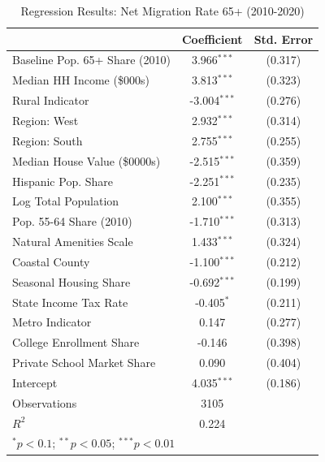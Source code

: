\begin{table}[htbp]
\centering
\caption{Regression Results: Net Migration Rate 65+ (2010-2020)}
\label{tab:netmig_regression}
\begin{tabular}{lcc}
\hline\hline
 & Coefficient & Std. Error \\
\hline
Baseline Pop. 65+ Share (2010) & 3.966$^{***}$ & (0.317) \\
Median HH Income (\$000s) & 3.813$^{***}$ & (0.323) \\
Rural Indicator & -3.004$^{***}$ & (0.276) \\
Region: West & 2.932$^{***}$ & (0.314) \\
Region: South & 2.755$^{***}$ & (0.255) \\
Median House Value (\$0000s) & -2.515$^{***}$ & (0.359) \\
Hispanic Pop. Share & -2.251$^{***}$ & (0.235) \\
Log Total Population & 2.100$^{***}$ & (0.355) \\
Pop. 55-64 Share (2010) & -1.710$^{***}$ & (0.313) \\
Natural Amenities Scale & 1.433$^{***}$ & (0.324) \\
Coastal County & -1.100$^{***}$ & (0.212) \\
Seasonal Housing Share & -0.692$^{***}$ & (0.199) \\
State Income Tax Rate & -0.405$^{*}$ & (0.211) \\
Metro Indicator & 0.147 & (0.277) \\
College Enrollment Share & -0.146 & (0.398) \\
Private School Market Share & 0.090 & (0.404) \\
Intercept & 4.035$^{***}$ & (0.186) \\
\hline
Observations & 3105 & \\
$R^2$ & 0.224 & \\
\hline\hline
\multicolumn{3}{l}{\footnotesize $^{*}p<0.1$; $^{**}p<0.05$; $^{***}p<0.01$} \\
\end{tabular}
\end{table}